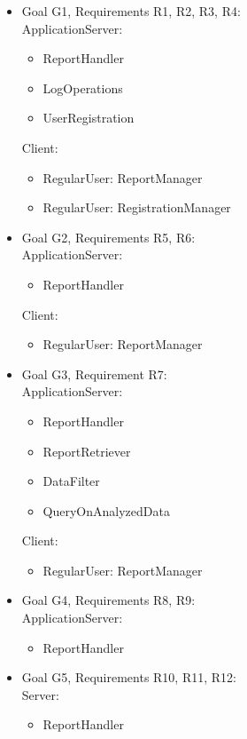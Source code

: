 \begin{itemize}
	\item Goal G1, Requirements R1, R2, R3, R4: \\ 
	ApplicationServer:
	\begin{itemize}
		\item ReportHandler
		\item LogOperations
		\item UserRegistration
	\end{itemize}
	Client:
	\begin{itemize}
		\item RegularUser: ReportManager
		\item RegularUser: RegistrationManager
	\end{itemize}
	\item Goal G2, Requirements R5, R6:\\
	ApplicationServer:
	\begin{itemize}
		\item ReportHandler
	\end{itemize}
	Client:	
	\begin{itemize}
		\item RegularUser: ReportManager
	\end{itemize}
	\item Goal G3, Requirement R7:\\
	ApplicationServer:
	\begin{itemize}
		\item ReportHandler
		\item ReportRetriever
		\item DataFilter
		\item QueryOnAnalyzedData
	\end{itemize}
	Client:
	\begin{itemize}
		\item RegularUser: ReportManager
	\end{itemize}
	\item Goal G4, Requirements R8, R9:\\
	ApplicationServer:
	\begin{itemize}
		\item ReportHandler
	\end{itemize}
	\item Goal G5, Requirements R10, R11, R12:\\Server:
	\begin{itemize}
		\item ReportHandler
	\end{itemize}

\end{itemize}
